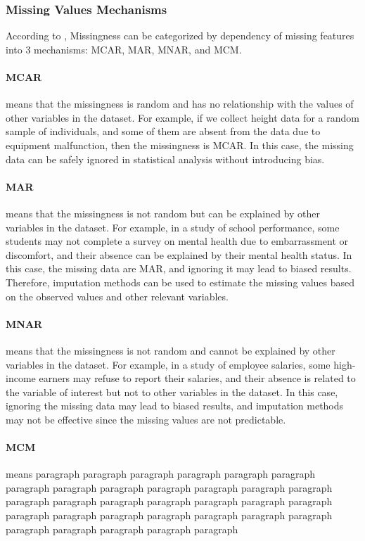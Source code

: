 \subsubsection{Missing Values Mechanisms}
According to \cite{Rubin}, Missingness can be categorized by dependency of missing features into 3 mechanisms: MCAR, MAR, MNAR, and MCM.

\paragraph{MCAR} means that the missingness is random and has no relationship with the values of other variables in the dataset. For example, if we collect height data for a random sample of individuals, and some of them are absent from the data due to equipment malfunction, then the missingness is MCAR. In this case, the missing data can be safely ignored in statistical analysis without introducing bias.

\paragraph{MAR} means that the missingness is not random but can be explained by other variables in the dataset. For example, in a study of school performance, some students may not complete a survey on mental health due to embarrassment or discomfort, and their absence can be explained by their mental health status. In this case, the missing data are MAR, and ignoring it may lead to biased results. Therefore, imputation methods can be used to estimate the missing values based on the observed values and other relevant variables.

\paragraph{MNAR} means that the missingness is not random and cannot be explained by other variables in the dataset. For example, in a study of employee salaries, some high-income earners may refuse to report their salaries, and their absence is related to the variable of interest but not to other variables in the dataset. In this case, ignoring the missing data may lead to biased results, and imputation methods may not be effective since the missing values are not predictable.

\paragraph{MCM} means paragraph paragraph paragraph paragraph paragraph paragraph paragraph paragraph paragraph paragraph paragraph paragraph paragraph paragraph paragraph paragraph paragraph paragraph paragraph paragraph paragraph paragraph paragraph paragraph paragraph paragraph paragraph paragraph paragraph paragraph paragraph paragraph 

